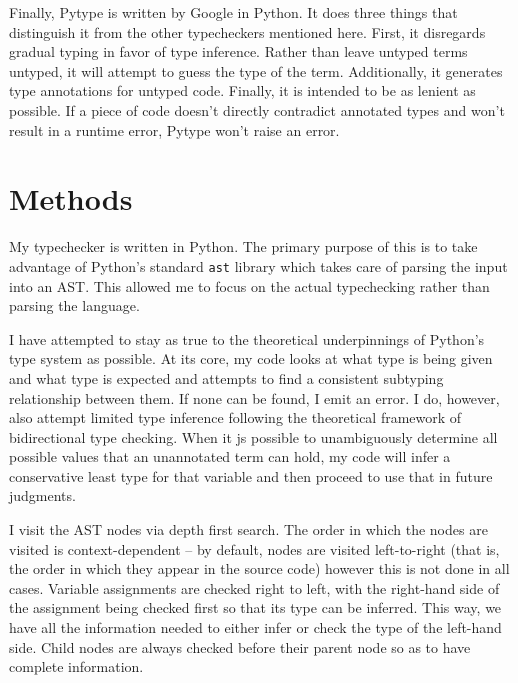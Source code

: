\documentclass[10pt,twocolumn]{article}
\begin{document}
Finally, Pytype is written by Google in Python. It does three things that distinguish it from the other typecheckers mentioned here. First, it disregards gradual typing in favor of type inference. Rather than leave untyped terms untyped, it will attempt to guess the type of the term. Additionally, it generates type annotations for untyped code. Finally, it is intended to be as lenient as possible. If a piece of code doesn't directly contradict annotated types and won't result in a runtime error, Pytype won't raise an error. 

\section{Methods}

My typechecker is written in Python. The primary purpose of this is to take advantage of Python's standard \verb|ast| library which takes care of parsing the input into an AST. This allowed me to focus on the actual typechecking rather than parsing the language.

I have attempted to stay as true to the theoretical underpinnings of Python's type system as possible. At its core, my code looks at what type is being given and what type is expected and attempts to find a consistent subtyping relationship between them. If none can be found, I emit an error. I do, however, also attempt limited type inference following the theoretical framework of bidirectional type checking. When it js possible to unambiguously determine all possible values that an unannotated term can hold, my code will infer a conservative least type for that variable and then proceed to use that in future judgments. 

I visit the AST nodes via depth first search. The order in which the nodes are visited is context-dependent -- by default, nodes are visited left-to-right (that is, the order in which they appear in the source code) however this is not done in all cases. Variable assignments are checked right to left, with the right-hand side of the assignment being checked first so that its type can be inferred. This way, we have all the information needed to either infer or check the type of the left-hand side. Child nodes are always checked before their parent node so as to have complete information. 
\end{document}
